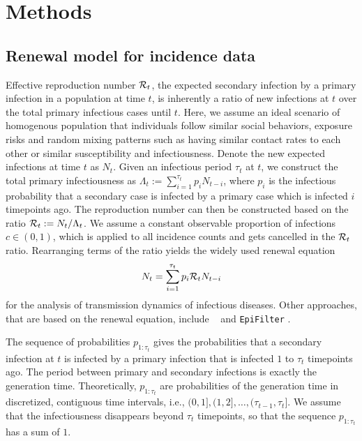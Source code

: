 \section{Methods}

\subsection{Renewal model for incidence data} 

Effective reproduction number $\mathcal{R}_t$, the expected secondary infection by a primary infection in a population at time $t$, is inherently a ratio of new infections at $t$ over the total primary infectious cases until $t$. Here, we assume an ideal scenario of homogenous population that individuals follow similar social behaviors, exposure risks and random mixing patterns such as having similar contact rates to each other or similar susceptibility and infectiousness. 
Denote the new expected infections at time $t$ as $N_t$. Given an infectious period $\tau_t$ at $t$, we construct the total primary infectiousness as $\Lambda_t := \sum_{i=1}^{\tau_t} p_i N_{t-i}$, where $p_i$ is the infectious probability that a secondary case is infected by a primary case which is infected $i$ timepoints ago. The reproduction number can then be constructed based on the ratio $\mathcal{R}_t := N_t / \Lambda_t$. We assume a constant observable proportion of infections $c\in (0,1)$, which is applied to all incidence counts and gets cancelled in the $\mathcal{R}_t$ ratio. 
Rearranging terms of the ratio yields the widely used renewal equation 
\begin{equation} \label{eq:renew-equation}
  N_t = \sum_{i=1}^{\tau_t} p_i\mathcal{R}_t N_{t-i}
\end{equation}
for the analysis of transmission dynamics of infectious diseases. Other approaches, that are based on the renewal equation, include \EpiEstim\ \citep{cori2013new} and \texttt{EpiFilter} \citep{parag2021improved}. 

The sequence of probabilities $p_{1:\tau_t}$ gives the probabilities that a secondary infection at $t$ is infected by a primary infection that is infected $1$ to $\tau_t$ timepoints ago. The period between primary and secondary infections is exactly the generation time. Theoretically, $p_{1:\tau_t}$ are probabilities of the generation time in discretized, contiguous time intervals, i.e., $(0,1], (1,2], \dots, (\tau_{t-1}, \tau_t]$. We assume that the infectiousness disappears beyond $\tau_t$ timepoints, so that the sequence $p_{1:\tau_t}$ has a sum of $1$. 

